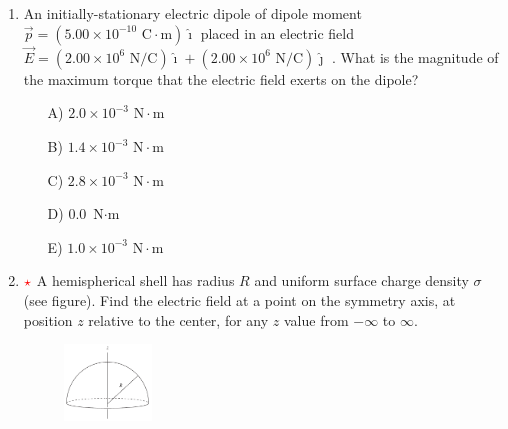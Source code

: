 \begin{enumerate}
    \begin{multicols}{5}
    \begin{itemize}
        \item[A)] 60 mJ
        \item[B)] 30 mJ
        \item[C)] 0
        \item[D)] 20 mJ
        \item[E)] 120 mJ
    \end{itemize}
    \end{multicols}


    \item An initially-stationary electric dipole of dipole moment $\vec{p}=(5.00 \times 10^{-10} \text{ C} \cdot \text{m})\hat\imath$ placed in an electric field $\vec{E}= (2.00 \times 10^6 \text{ N/C})\hat{\imath} + (2.00 \times 10^6 \text{ N/C})\hat{\jmath}$ . What is the magnitude of the maximum torque that the electric field exerts on the dipole?

    \begin{multicols}{5}
    \begin{itemize}
        \item[A)] $2.0\times10^{-3}\text{ N}\cdot\text{m}$ 
        \item[B)] $1.4\times10^{-3}\text{ N}\cdot\text{m}$ 
        \item[C)] $2.8\times10^{-3}\text{ N}\cdot\text{m}$ 
        \item[D)] 0.0 $\text{N}\cdot\text{m}$ 
        \item[E)] $1.0\times10^{-3}\text{ N}\cdot\text{m}$ 
    \end{itemize}
    \end{multicols}


    \item $\color{red}{\star}$ A hemispherical shell has radius $R$ and uniform surface charge density $\sigma$ (see figure). Find the electric field at a point on the symmetry axis, at position $z$ relative to the center, for any $z$ value from $-\infty$ to $\infty$.

    \begin{figure}[H]
        \centering
        \includegraphics[width=0.22\textwidth]{figures-workshop01/problem-17.png}
    \end{figure}


\end{enumerate}
